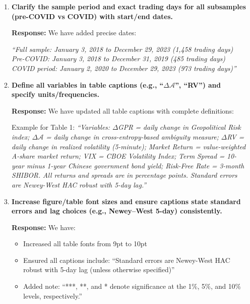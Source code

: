 \documentclass[12pt]{article}
\begin{document}
\begin{enumerate}
    \item \textbf{Clarify the sample period and exact trading days for all subsamples (pre-COVID vs COVID) with start/end dates.}

    \begin{responsebox}
    \textbf{Response:} We have added precise dates:
    
    \textit{``Full sample: January 3, 2018 to December 29, 2023 (1,458 trading days)
    Pre-COVID: January 3, 2018 to December 31, 2019 (485 trading days)
    COVID period: January 2, 2020 to December 29, 2023 (973 trading days)''}
    \end{responsebox}

    \item \textbf{Define all variables in table captions (e.g., ``$\Delta \mathcal{A}$'', ``RV'') and specify units/frequencies.}

    \begin{responsebox}
    \textbf{Response:} We have updated all table captions with complete definitions:

    Example for Table 1:
    \textit{``Variables: $\Delta$GPR = daily change in Geopolitical Risk index; $\Delta \mathcal{A}$ = daily change in cross-entropy-based ambiguity measure; $\Delta$RV = daily change in realized volatility (5-minute); Market Return = value-weighted A-share market return; VIX = CBOE Volatility Index; Term Spread = 10-year minus 1-year Chinese government bond yield; Risk-Free Rate = 3-month SHIBOR. All returns and spreads are in percentage points. Standard errors are Newey-West HAC robust with 5-day lag.''}
    \end{responsebox}

    \item \textbf{Increase figure/table font sizes and ensure captions state standard errors and lag choices (e.g., Newey--West 5-day) consistently.}

    \begin{responsebox}
    \textbf{Response:} We have:
    \begin{itemize}
        \item Increased all table fonts from 9pt to 10pt
        \item Ensured all captions include: ``Standard errors are Newey-West HAC robust with 5-day lag (unless otherwise specified)''
        \item Added note: ``***, **, and * denote significance at the 1\%, 5\%, and 10\% levels, respectively.''
    \end{itemize}
    \end{responsebox}


\end{enumerate}
\end{document}
